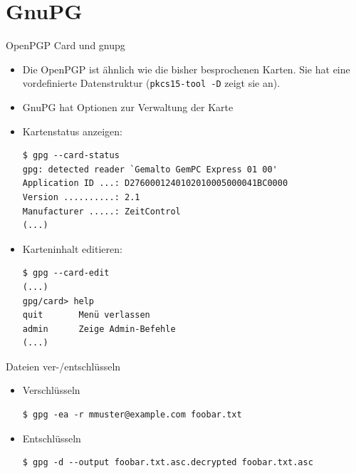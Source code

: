 \documentclass{beamer}
\begin{document}
\section{GnuPG}
\begin{frame}[fragile]{OpenPGP Card und gnupg}
\begin{minipage}[t][\textheight][t]{\linewidth}
\begin{itemize}
	\item Die OpenPGP ist ähnlich wie die bisher besprochenen Karten. Sie hat eine
	vordefinierte Datenstruktur (\lstinline|pkcs15-tool -D| zeigt sie an).
	\item GnuPG hat Optionen zur Verwaltung der Karte
	\item Kartenstatus anzeigen:
	\begin{lstlisting}
$ gpg --card-status
gpg: detected reader `Gemalto GemPC Express 01 00'
Application ID ...: D2760001240102010005000041BC0000
Version ..........: 2.1
Manufacturer .....: ZeitControl
(...)	
	\end{lstlisting}
	\item Karteninhalt editieren:
	\begin{lstlisting}
$ gpg --card-edit
(...)
gpg/card> help
quit       Menü verlassen
admin      Zeige Admin-Befehle
(...)
	\end{lstlisting}
\end{itemize}
\end{minipage}
\end{frame}

\begin{frame}[fragile]{Dateien ver-/entschlüsseln}
\begin{minipage}[t][\textheight][t]{\linewidth}
\begin{itemize}
  \item Verschlüsseln
  \begin{lstlisting}
$ gpg -ea -r mmuster@example.com foobar.txt
  \end{lstlisting}
  \item Entschlüsseln
  \begin{lstlisting}
$ gpg -d --output foobar.txt.asc.decrypted foobar.txt.asc
  \end{lstlisting}
\end{itemize}
\end{minipage}
\end{frame}
\end{document}

